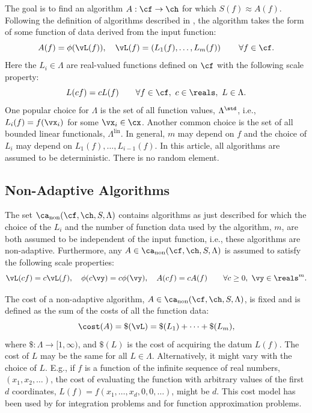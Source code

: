 \documentclass[]{elsarticle}
\DeclareMathOperator{\lin}{lin}
\DeclareMathOperator{\fix}{non}
\theoremstyle{definition}
\theoremstyle{remark}
\begin{document}
The goal is to find an algorithm $A:\cf \to \ch$ for which $S(f) \approx A(f)$. Following the definition of algorithms described in \cite[Section 3.2]{TraWasWoz88}, the algorithm takes the form of some function of data derived from the input function:
\begin{equation}
\label{algoform}
A(f) =  \phi(\vL(f)), \quad \vL(f) = \left(L_1(f), \ldots, L_m(f)\right) \qquad \forall f \in \cf.
\end{equation}
Here the $L_i \in \Lambda$ are real-valued functions defined on $\cf$ with the following scale property:
\begin{equation}
\label{dataassump}
L(cf) = cL(f) \qquad \forall f \in \cf, \ c \in \reals, \ L \in \Lambda.
\end{equation}
One popular choice for $\Lambda$ is the set of all function values, $\Lambda^{\std}$, i.e., $L_i(f) = f(\vx_i)$ for some $\vx_i \in \cx$.  Another common choice is the set of all bounded linear functionals, $\Lambda^{\lin}$.  In general, $m$ may depend on $f$ and the choice of $L_i$ may depend on $L_1(f), \ldots, L_{i-1}(f)$.  In this article, all algorithms are assumed to be deterministic.  There is no random element.

\subsection{Non-Adaptive Algorithms} \label{NonAdaptsec}

The set $\ca_{\fix}(\cf,\ch,S,\Lambda)$ contains algorithms as just described for which the choice of the $L_i$ and the number of function data used by the algorithm, $m$, are both assumed to be independent of the input function, i.e., these algorithms are non-adaptive.  Furthermore, any $A \in \ca_{\fix}(\cf,\ch,S,\Lambda)$ is assumed to satisfy the following scale properties:
\begin{equation}
\label{algoscale}
\vL(cf) = c \vL(f), \quad 
\phi(c\vy) = c\phi(\vy), \quad A(cf) = cA(f) \qquad \forall c \ge 0, \ \vy \in \reals^m.
\end{equation}

The cost of a non-adaptive algorithm, $A \in  \ca_{\fix}(\cf,\ch,S,\Lambda)$, is fixed and is defined as the sum of the costs of all the function data:
\begin{equation} \label{costfix}
\cost(A) = \$(\vL) = \$(L_1) + \cdots +\$(L_m),
\end{equation}
where $\$:\Lambda \to [1,\infty)$, and $\$(L)$ is the cost of acquiring the datum $L(f)$. The cost of $L$ may be the same for all $L \in \Lambda$.  Alternatively, it might vary with the choice of $L$.  E.g., if $f$ is a function of the infinite sequence of real numbers, $(x_1, x_2, \ldots)$, the cost of evaluating the function with arbitrary values of the first $d$ coordinates, $L(f)=f(x_1, \ldots, x_d, 0, 0, \ldots)$, might be $d$.  This cost model has been used by \cite{HicMGRitNiu09a,KuoEtal10a,NiuHic09a,NiuHic09b,PlaWas11a} for integration problems and \cite{Was13a,WasWoz11a,WasWoz11b} for function approximation problems.
\end{document}
